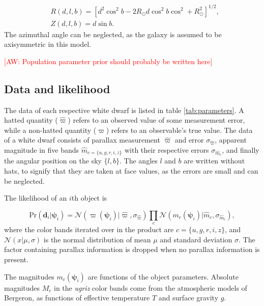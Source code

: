 \documentclass[fleqn,usenatbib]{mnras}
\newcommand{\aw}[1]{\textcolor{red}{[AW: #1]}}
\newcommand{\objp}{\boldsymbol{\psi}}
\newcommand{\data}{\mathbf{d}}
\newcommand{\Teff}{T}
\newcommand{\logg}{g}
\newcommand{\pr}{\text{Pr}}
\begin{document}
\begin{equation}
\begin{split}
	& R(d,l,b) = [d^2\cos^2b-2 R_\odot d \cos^2b\cos^2+R_\odot^2]^{1/2}, \\
	& Z(d,l,b) = d \sin b.
\end{split}
\end{equation}
The azimuthal angle can be neglected, as the galaxy is assumed to be axisymmetric in this model.

\aw{Population parameter prior should probably be written here}







\subsection{Data and likelihood}\label{sec:data}

The data of each respective white dwarf is listed in table \ref{tab:parameters}. A hatted quantity ($\hat{\varpi}$) refers to an observed value of some measurement error, while a non-hatted quantity ($\varpi$) refers to an observable's true value. The data of a white dwarf consists of parallax measurement $\hat{\varpi}$ and error $\sigma_{\hat{\varpi}}$, apparent magnitude in five bands $\hat{m}_{c=\{u,g,r,i,z\}}$ with their respective errors $\sigma_{\hat{m}_c}$, and finally the angular position on the sky $\{l,b\}$. The angles $l$ and $b$ are written without hats, to signify that they are taken at face values, as the errors are small and can be neglected.

The likelihood of an $i$th object is

\begin{equation}
	\pr(\data_i | \objp_i) = \mathcal{N}(\varpi(\objp_i)|\hat{\varpi},\sigma_{\hat{\varpi}})\prod_{c} \mathcal{N}(m_c(\objp_i)|\hat{m}_c,\sigma_{\hat{m}_c}),
\end{equation}
where the color bands iterated over in the product are $c = \{u,g,r,i,z\}$, and $\mathcal{N}(x | \mu,\sigma)$ is the normal distribution of mean $\mu$ and standard deviation $\sigma$. The factor containing parallax information is dropped when no parallax information is present.

The magnitudes $m_c(\objp_i)$ are functions of the object parameters. Absolute magnitudes $M_c$ in the \emph{ugriz} color bands come from the atmospheric models of Bergeron, as functions of effective temperature $\Teff$ and surface gravity $\logg$.
\end{document}
